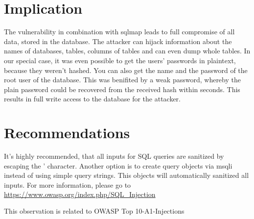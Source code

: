 \documentclass{article}
\begin{document}
\section*{Implication}
The vulnerability in combination with sqlmap leads to full compromise of all data, stored in the database. The attacker can hijack information about the names of databases, tables, columns of tables and can even dump whole tables.  In our special case, it was even possible to get the users' passwords in plaintext, because they weren't hashed.
You can also get the name and the password of the root user of the database. This was benifited by a weak password, whereby the plain password could be recovered from the received hash within seconds. This results in full write access to the database for the attacker.


\section*{Recommendations}
It's highly recommended, that all inputs for SQL queries are sanitized by escaping the ' character.
Another option is to create query objects via msqli instead of using simple query strings.
This objects will automatically sanitized all inputs. For more information, please go to \url{https://www.owasp.org/index.php/SQL\_Injection}

This observation is related to OWASP Top 10-A1-Injections
\end{document}
